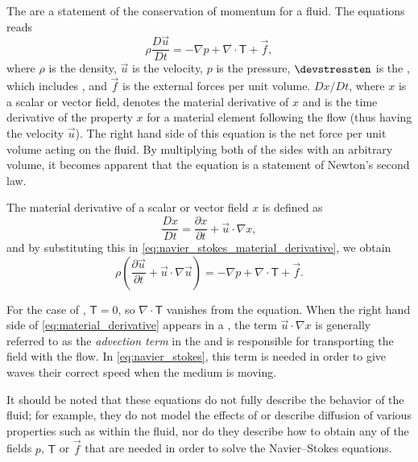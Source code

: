 The  are a statement of the conservation of momentum for a fluid. The  equations reads
%
\begin{equation} \label{eq:navier_stokes_material_derivative}
\rho\frac{D\vec{u}}{Dt} = -\nabla p + \nabla\cdot\boldsymbol{\mathsf{T}} + \vec{f},
\end{equation}
%
where $\rho$ is the density, $\vec{u}$ is the velocity, $p$ is the pressure, $\devstressten$ is the , which includes , and $\vec{f}$ is the external forces per unit volume. $Dx/Dt$, where $x$ is a scalar or vector field, denotes the material derivative of $x$ and is the time derivative of the property $x$ for a material element following the flow (thus having the velocity $\vec{u}$). The right hand side of this equation is the net force per unit volume acting on the fluid. By multiplying both of the sides with an arbitrary volume, it becomes apparent that the equation is a statement of Newton's second law.

The material derivative of a scalar or vector field $x$ is defined as
%
\begin{equation} \label{eq:material_derivative}
\frac{Dx}{Dt} = \frac{\partial x}{\partial t} + \vec{u}\cdot\nabla x,
\end{equation}
%
and by substituting this in \eqref{eq:navier_stokes_material_derivative}, we obtain
%
\begin{equation} \label{eq:navier_stokes}
\rho\left(\frac{\partial\vec{u}}{\partial t} + \vec{u}\cdot\nabla\vec{u}\right) = -\nabla p + \nabla\cdot\boldsymbol{\mathsf{T}} + \vec{f}.
\end{equation}

For the case of , ${\boldsymbol{\mathsf{T}} = 0}$, so ${\nabla\cdot\boldsymbol{\mathsf{T}}}$ vanishes from the equation. When the right hand side of \eqref{eq:material_derivative} appears in a \PDE, the term $\vec{u}\cdot\nabla x$ is generally referred to as the \emph{advection term} in the \PDE and is responsible for transporting the field with the flow. In \eqref{eq:navier_stokes}, this term is needed in order to give waves their correct speed when the medium is moving.

It should be noted that these equations do not fully describe the behavior of the fluid; for example, they do not model the effects of  or describe diffusion of various properties such as \temperature within the fluid, nor do they describe how to obtain any of the fields $p$, $\boldsymbol{\mathsf{T}}$ or $\vec{f}$ that are needed in order to solve the Navier--Stokes equations.

